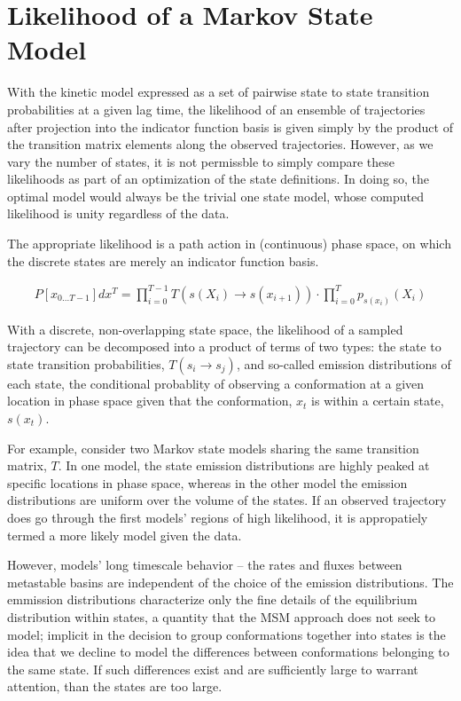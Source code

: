 \documentclass[twocolumn,floatfix,nofootinbib,aps]{revtex4-1}
\begin{document}
\section{Likelihood of a Markov State Model}
With the kinetic model expressed as a set of pairwise state to state transition probabilities at a given lag time, the likelihood of an ensemble of trajectories after projection into the indicator function basis is given simply by the product of the transition matrix elements along the observed trajectories. However, as we vary the number of states, it is not permissble to simply compare these likelihoods as part of an optimization of the state definitions. In doing so, the optimal model would always be the trivial one state model, whose computed likelihood is unity regardless of the data.

The appropriate likelihood is a path action in (continuous) phase space, on which the discrete states are merely an indicator function basis.

\begin{align}
P[x_{0...T-1}] dx^T = \prod_{i=0}^{T-1} T(s(X_i) \rightarrow s(x_{i+1})) \cdot \prod_{i=0}^{T} p_{s(x_i)}(X_{i})
\label{eq:like}
\end{align}

With a discrete, non-overlapping state space, the likelihood of a sampled trajectory can be decomposed into a product of terms of two types: the state to state transition probabilities, $T(s_i \rightarrow s_j)$, and so-called emission distributions of each state, the conditional probablity of observing a conformation at a given location in phase space given that the conformation, $x_t$ is within a certain state, $s(x_t)$.

For example, consider two Markov state models sharing the same transition matrix, $T$. In one model, the state emission distributions are highly peaked at specific locations in phase space, whereas in the other model the emission distributions are uniform over the volume of the states. If an observed trajectory does go through the first models’ regions of high likelihood, it is appropatiely termed a more likely model given the data.

However, models' long timescale behavior -- the rates and fluxes between metastable basins are independent of the choice of the emission distributions. The emmission distributions characterize only the fine details of the equilibrium distribution within states, a quantity that the MSM approach does not seek to model; implicit in the decision to group conformations together into states is the idea that we decline to model the differences between conformations belonging to the same state. If such differences exist and are sufficiently large to warrant attention, than the states are too large.
\end{document}
